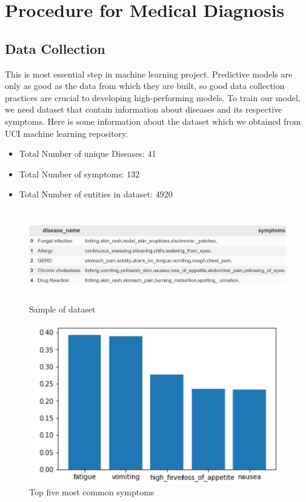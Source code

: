 \section{Procedure for Medical Diagnosis}
\subsection{Data Collection}
This is most essential step in machine learning project. Predictive models are only as good as the data from which they are built, so good data collection practices are crucial to developing high-performing models. To train our model, we need dataset that contain information about diseases and its respective symptoms.\newline
Here is some information about the dataset which we obtained from UCI machine learning repository.
\begin{itemize}
    \item Total Number of unique Diseases: 41
    \item Total Number of symptoms: 132
    \item Total Number of entities in dataset: 4920
     
\end{itemize}

\begin{figure}[h]
\includegraphics[width=160mm,height=40mm]{dataset_summary/diseaseAndSymptoms.jpg}
 \caption{Sample of dataset}
\end{figure}

\begin{figure}[H]
 \includegraphics[width=150mm,height=70mm]{dataset_summary/top5Disease.jpg}
 \caption{Top five most common symptoms}
\end{figure}

